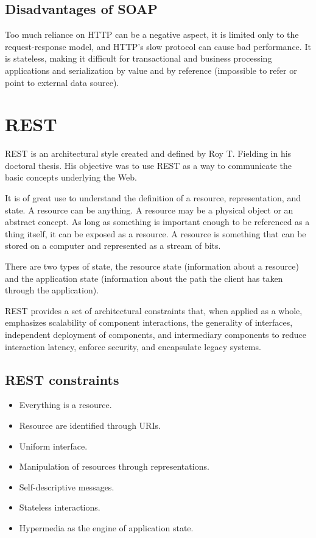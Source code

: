 \documentclass[conference]{IEEEtran}
\begin{document}
\subsection{Disadvantages of SOAP}

Too much reliance on HTTP can be a negative aspect, it is limited only to the request-response model, and HTTP's slow protocol can cause bad performance. It is stateless, making it difficult for transactional and business processing applications and serialization by value and by reference (impossible to refer or point to external data source).

\section{REST}
\label{sec:rest}

REST is an architectural style created and defined by Roy T. Fielding in his doctoral thesis. His objective was to use REST as a way to communicate the basic concepts underlying the Web. 

It is of great use to understand the definition of a resource, representation, and state. A resource can be anything. A resource may be a physical object or an abstract concept. As long as something is important enough to be referenced as a thing itself, it can be exposed as a resource. A resource is something that can be stored on a computer and represented as a stream of bits. \cite{Rest-WebServices-2009}

There are two types of state, the resource state (information about a resource) and the application state (information about the path the client has taken through the application).

REST provides a set of architectural constraints that, when applied as a whole, emphasizes scalability of component interactions, \cite{Rest-WebServices-2009} the generality of interfaces, independent deployment of components, and intermediary components to reduce interaction latency, enforce security, and encapsulate legacy systems.

\subsection{REST constraints}

\begin{itemize}
  \item Everything is a resource.
  \item Resource are identified through URIs.
  \item Uniform interface.
  \item Manipulation of resources through representations.
  \item Self-descriptive messages.
  \item Stateless interactions.
  \item Hypermedia as the engine of application state.
\end{itemize}
\end{document}
